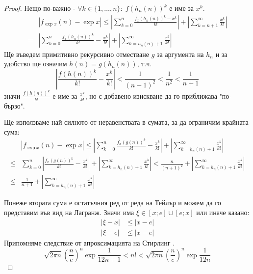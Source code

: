 \begin{proof}
    Нещо по-важно - $\forall k \in \{1, \dots, n\}:\; f(h_n(n))^k$ е име за $x^k$.
    \begin{equation}
        \begin{split}
             & |f_{\exp x}(n) - \exp x| \leq \left|\sum\limits_{k=0}^{n} \frac{f_x(h_n(n))^k - x^k}{k!}\right| + \left| \sum\limits_{k=n+1}^{\infty} \frac{x^k}{k!} \right| \\
             = & \left|\sum\limits_{k=0}^{n}\frac{f_x(h_n(n))^k}{k!} - \frac{x^k}{k!}\right| + \left| \sum\limits_{k=h_n(n)+1}^{\infty} \frac{x^k}{k!} \right|
        \end{split}
    \end{equation}
    Ще въведем примитивно рекурсивно отместване $g$ за аргумента на $h_n$ и за удобство  ще означим $h(n) = g(h_n(n))$, т.ч.
    \begin{equation*}
        \left| \frac{f(h(n))^k}{k!} - \frac{x^k}{k!} \right| < \frac{1}{(n+1)^2} < \frac{1}{n^2} < \frac{1}{n+1}
    \end{equation*}
    значи $\frac{f(h(n))^k}{k!}$ е име за $\frac{x^k}{k!}$, но с добавено изискване да го приближава "по-бързо".

    Ще използваме най-силното от неравенствата в сумата, за да ограничим крайната сума:
    \begin{equation}
        \begin{split}
             & |f_{\exp x}(n) - \exp x| \leq \left|\sum\limits_{k=0}^{n}\frac{f_x(g(n))^k}{k!} - \frac{x^k}{k!}\right| + \left| \sum\limits_{k=h_n(n)+1}^{\infty} \frac{x^k}{k!} \right| \\
             \leq & \sum\limits_{k=0}^{n} \left|\frac{f_x(g(n))^k}{k!} - \frac{x^k}{k!}\right| + \left| \sum\limits_{k=h_n(n)+1}^{\infty} \frac{x^k}{k!} \right| < \frac{n}{(n+1)^2} + \left| \sum\limits_{k=h_n(n)+1}^{\infty} \frac{x^k}{k!} \right| \\
             \leq & \frac{1}{n+1} + \left| \sum\limits_{k=h_n(n)+1}^{\infty} \frac{x^k}{k!} \right|
        \end{split}
    \end{equation}
    
    Понеже втората сума е остатъчния ред от реда на Тейлър и можем да го представим във вид на Лагранж. Значи има $\xi \in [x; e] \cup [e; x]$ или иначе казано:
    \begin{equation*}
        \begin{split}
            |\xi - x| & \leq |x-e| \\
            |\xi - e| & \leq |x-e|
        \end{split}
    \end{equation*}
    Припомняме следствие от апроксимацията на Стирлинг \cite{dutka1991early, tweddle2003james}.
    \begin{equation}\tag{Стирлинг}\label{eq:stirling}
        \sqrt{2 \pi n} \left(\frac{n}{e}\right)^n \exp\frac{1}{12n + 1} < n! < \sqrt{2 \pi n} \left(\frac{n}{e}\right)^n \exp\frac{1}{12n}
    \end{equation}
    

\end{proof}
